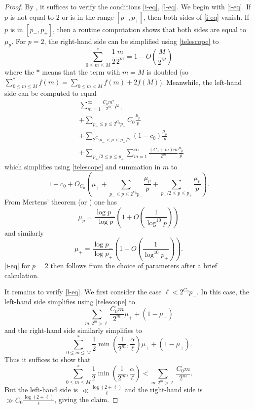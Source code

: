 \documentclass[10pt,a4paper,reqno]{amsart}
\numberwithin{equation}{section}
\theoremstyle{plain}
\theoremstyle{definition}
\begin{document}
\begin{proof}
By , it suffices to verify the conditions \eqref{i-eq}, \eqref{l-eq}.  We begin with \eqref{i-eq}.  If $p$ is not equal to $2$ or is in the range $[p_-,p_+]$, then both sides of \eqref{i-eq} vanish.  If $p$ is in $[p_-,p_+]$, then a routine computation shows that both sides are equal to $\mu_p$.  For $p=2$, the right-hand side can be simplified using \eqref{telescope} to
$$ \sum_{0 \leq m \leq M}^* \frac{1}{2} \frac{m}{2^m} = 1 - O\left( \frac{M}{2^M} \right)$$
where the $*$ means that the term with $m=M$ is doubled (so $\sum_{0 \leq m \leq M}^* f(m) = \sum_{0 \leq m<M} f(m) + 2 f(M)$).  Meanwhile, the left-hand side can be computed to equal
\begin{align*}
  &\sum_{m=1}^\infty \frac{C_0 m^2}{2^m} \mu_+ \\
  & + \sum_{p_- \leq p \leq 2^{C_0} p_-} C_0 \frac{\mu_p}{p} \\
  & + \sum_{2^{C_0} p_- < p < p_+/2} (1-c_0) \frac{\mu_p}{p} \\
  & + \sum_{p_+/2 \leq p \leq p_+} \sum_{m=1}^\infty \frac{(C_0+m) m}{2^m} \frac{\mu_p}{p}
\end{align*}
which simplifies using \eqref{telescope} and summation in $m$ to
$$ 1 - c_0 + O_{C_0}\left( \mu_+ + \sum_{p_- \leq p \leq 2^{C_0} p_-} \frac{\mu_p}{p} + \sum_{p_+/2 \leq p \leq p_+} \frac{\mu_p}{p}\right).$$
From Mertens' theorem (or ) one has
\begin{equation}\label{mertens}
  \mu_p = \frac{\log p_-}{\log p} \left( 1 + O\left( \frac{1}{\log^{10} p} \right) \right)
\end{equation}
and similarly
\begin{equation}\label{mertens-2}
  \mu_+ = \frac{\log p_-}{\log p_+} \left( 1 + O\left( \frac{1}{\log^{10} p_+} \right) \right).
\end{equation}
\eqref{i-eq} for $p=2$ then follows from the choice of parameters after a brief calculation.

It remains to verify \eqref{l-eq}.  We first consider the case $\ell < 2^{C_0} p_-$.  In this case, the left-hand side simplifies using \eqref{telescope} to
$$ \sum_{m: 2^m > \ell} \frac{C_0 m}{2^m} \mu_+ + (1-\mu_+)$$
and the right-hand side similarly simplifies to
$$ \sum_{0 \leq m \leq M}^* \frac{1}{2} \min\left( \frac{1}{2^m}, \frac{\alpha}{\ell}\right) \mu_+ + (1-\mu_+).$$
Thus it suffices to show that
\begin{equation}\label{lint} \sum_{0 \leq m \leq M}^* \frac{1}{2} \min\left( \frac{1}{2^m}, \frac{\alpha}{\ell}\right) < \sum_{m: 2^m > \ell} \frac{C_0 m}{2^m}.
\end{equation}
But the left-hand side is $\ll \frac{\log (2+\ell)}{\ell}$ and the right-hand side is $\gg C_0 \frac{\log (2+\ell)}{\ell}$, giving the claim.


\end{proof}
\end{document}
